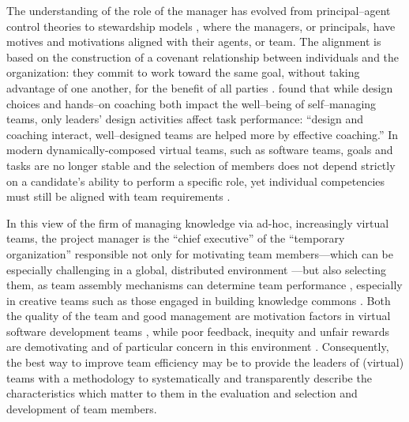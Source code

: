The understanding of the role of the manager has evolved from principal--agent control theories to stewardship models \citep{DavisSchoormanDonaldson97}, where the managers, or principals, have motives and motivations aligned with their agents, or team. The alignment is based on the construction of a covenant relationship between individuals and the organization: they commit to work toward the same goal, without taking advantage of one another, for the benefit of all parties \citep{Hernandez12}.  \cite{Wageman01} found that while design choices and hands--on coaching both impact the well--being of self--managing teams, only leaders' design activities affect task performance: ``design and coaching interact, well--designed teams are helped more by effective coaching.'' In modern dynamically-composed virtual teams, such as software teams, goals and tasks are no longer stable and the selection of members does not depend strictly on a candidate's ability to perform a specific role, yet individual competencies must still be aligned with team requirements \citep{tannenbaum:2012:teams}.

In this view of the firm of managing knowledge via ad-hoc, increasingly virtual teams, the project manager is the ``chief executive'' of the ``temporary organization'' \citep{TurnerMuller03} responsible not only for motivating team members---which can be especially challenging in a global, distributed environment \citep{beecham:2014:motivating,noll:2016:global}---but also selecting them, as team assembly mechanisms can determine team performance \citep{Guimeraetal05}, especially in creative teams such as those engaged in building knowledge commons \citep{HessOstrom06b}. Both the quality of the team and good management are motivation factors in virtual software development teams \citep{beecham2015motivates}, while poor feedback, inequity and unfair rewards are demotivating and of particular concern in this environment \citep{deshpande:2009:management}. Consequently, the best way to improve team efficiency may be to provide the leaders of (virtual) teams with a methodology to systematically and transparently describe the characteristics which matter to them in the evaluation and selection and development of team members.

